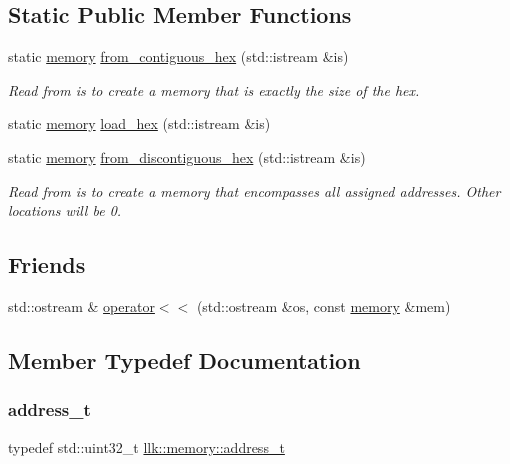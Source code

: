 \subsection*{Static Public Member Functions}
\begin{DoxyCompactItemize}
\item 
static \hyperlink{classllk_1_1memory}{memory} \hyperlink{classllk_1_1memory_a21247daa4aa05ac0e4841c7771e68feb}{from\+\_\+contiguous\+\_\+hex} (std\+::istream \&is)
\begin{DoxyCompactList}\small\item\em Read from {\ttfamily is} to create a memory that is exactly the size of the hex. \end{DoxyCompactList}\item 
static \hyperlink{classllk_1_1memory}{memory} \hyperlink{classllk_1_1memory_a442c8533296f44afb2152129417e02ba}{load\+\_\+hex} (std\+::istream \&is)
\item 
static \hyperlink{classllk_1_1memory}{memory} \hyperlink{classllk_1_1memory_a86fbd7265d551f2e18e943028d2b8728}{from\+\_\+discontiguous\+\_\+hex} (std\+::istream \&is)
\begin{DoxyCompactList}\small\item\em Read from {\ttfamily is} to create a memory that encompasses all assigned addresses. Other locations will be 0. \end{DoxyCompactList}\end{DoxyCompactItemize}
\subsection*{Friends}
\begin{DoxyCompactItemize}
\item 
std\+::ostream \& \hyperlink{classllk_1_1memory_aed852dd183dc752b9fc575dbe2113c1d}{operator$<$$<$} (std\+::ostream \&os, const \hyperlink{classllk_1_1memory}{memory} \&mem)
\end{DoxyCompactItemize}


\subsection{Member Typedef Documentation}
\mbox{\label{classllk_1_1memory_ae7a4b897aa999f22e250dc8e4d773dec}} 
\subsubsection{\texorpdfstring{address\+\_\+t}{address\_t}}
{\footnotesize\ttfamily typedef std\+::uint32\+\_\+t \hyperlink{classllk_1_1memory_ae7a4b897aa999f22e250dc8e4d773dec}{llk\+::memory\+::address\+\_\+t}}

